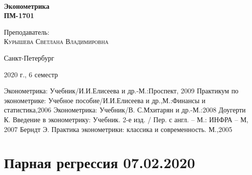 \documentclass[aps,%
12pt,%
final,%
oneside,
onecolumn,%
musixtex, %
superscriptaddress,%
centertags]{article} %
\begin{document}
\begin{titlepage} 
\begin{center}
 
\textbf{}\\[10.0cm]
\textbf{\LARGE Эконометрика}\\[0.5cm]
\textbf{\Large ПМ-1701} \\[0.1cm]

\begin{center} \large
{Преподаватель:} \\[0.5cm]
\textsc {Курышева Светлана Владимировна }\\
\end{center}
\vfill 

{\large {Санкт-Петербург}} \par
{\large {2020 г., 6 семестр}}
\end{center} 
\end{titlepage}

\begin{thebibliography}{3}
Эконометрика: Учебник/И.И.Елисеева и др.-М.:Проспект, 2009
Практикум по эконометрике: Учебное пособие/И.И.Елисеева и др.,М.:Финансы и статистика,2006 
Эконометрика: Учебник/В. С.Мхитарян и др.-М.:2008
Доугерти К. Введение в эконометрику: Учебник. 2-е изд. / Пер. с англ. – М.: ИНФРА – М, 2007
Берндт Э. Практика эконометрики: классика и современность. М.,2005
\end{thebibliography}
\tableofcontents
\newpage
\section{Парная регрессия 07.02.2020}
\end{document}

